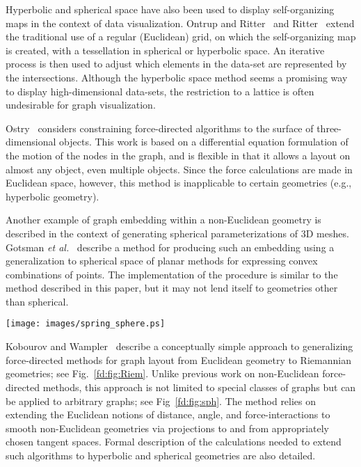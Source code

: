 \documentclass[notitlepage,letter,11pt]{article}
\begin{document}
Hyperbolic and spherical space have also been used to display
self-organizing maps in the context of data visualization. Ontrup and
Ritter~\cite{ontrup-hyperbolic} and
Ritter~\cite{ritter99selforganizing} extend the traditional use of a
regular (Euclidean) grid, on which the self-organizing map is created,
with a tessellation in spherical or hyperbolic space.  An iterative
process is then used to adjust which elements in the data-set are
represented by the intersections.  Although the hyperbolic space
method seems a promising way to display high-dimensional data-sets,
the restriction to a lattice is often undesirable for graph
visualization. 


Ostry~\cite{ostry96some} considers constraining force-directed
algorithms to the surface of three-dimensional objects. This work is
based on a differential equation formulation of the motion of the
nodes in the graph, and is flexible in that it allows a layout on
almost any object, even multiple objects.  Since the force
calculations are made in Euclidean space, however, this method is
inapplicable to certain geometries (e.g., hyperbolic geometry).

Another example of graph embedding within a non-Euclidean geometry is
described in the context of generating spherical parameterizations of
3D meshes. Gotsman {\em et al.}~\cite{ggs-fund-03} describe a method
for producing such an embedding using a generalization to spherical
space of planar methods for expressing convex combinations of points.
The implementation of the procedure is similar to the method described
in this paper, but it may not lend itself to geometries other than
spherical.


\begin{figure*}[t]
    \begin{center}
    \texttt{[image: images/spring\_sphere.ps]} 
\end{center}
   \caption{\small\sf An overview of a spring embedder on the sphere.}
\label{fd:fig:Riem}
\end{figure*}

Kobourov and Wampler~\cite{kw-nese-05} describe a conceptually simple
approach to generalizing force-directed methods for graph layout from
Euclidean geometry to Riemannian geometries; see Fig.~\ref{fd:fig:Riem}. Unlike previous work on
non-Euclidean force-directed methods, this approach is not limited to
special classes of graphs but can be applied to arbitrary graphs; see Fig~\ref{fd:fig:sph}. The
method relies on extending the Euclidean notions of distance, angle,
and force-interactions to smooth non-Euclidean geometries via
projections to and from appropriately chosen tangent spaces. Formal
description of the calculations needed to extend such algorithms to
hyperbolic and spherical geometries are also detailed.
\end{document}
